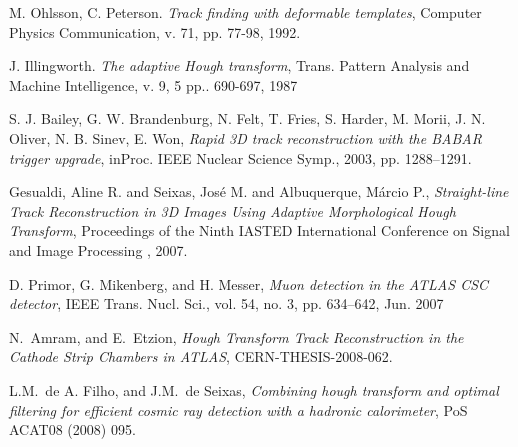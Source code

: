 \documentclass{JINST}
\begin{document}
\begin{thebibliography}{9}
 M. Ohlsson, C. Peterson. 
\emph{Track ﬁnding with deformable templates},
 Computer Physics Communication, v. 71, pp. 77-98, 1992.

 J. Illingworth. 
\emph{The adaptive Hough transform}, 
Trans. Pattern Analysis and Machine Intelligence, v. 9, 5 pp.. 690-697, 1987


 S. J. Bailey, G. W. Brandenburg, N. Felt, T. Fries, S. Harder, M. Morii, J. N. Oliver, N. B. Sinev, E. Won,
\emph{Rapid 3D track reconstruction with the BABAR trigger upgrade},
 inProc. IEEE Nuclear Science Symp., 2003, pp. 1288–1291.

 Gesualdi, Aline R. and Seixas, Jos{\'e} M. and Albuquerque, M\'{a}rcio P.,
\emph{Straight-line Track Reconstruction in 3D Images Using Adaptive Morphological Hough Transform},
 Proceedings of the Ninth IASTED International Conference on Signal and Image Processing , 2007.



 D. Primor, G. Mikenberg, and H. Messer,
\emph{Muon detection in the ATLAS CSC detector},
 IEEE Trans. Nucl. Sci., vol. 54, no. 3, pp. 634–642, Jun. 2007


 N.~Amram, and E.~Etzion,
\emph{Hough Transform Track Reconstruction in the Cathode Strip Chambers in ATLAS},
CERN-THESIS-2008-062.



 L.M.~de A. Filho, and J.M.~de Seixas,
\emph{Combining hough transform and optimal filtering for efficient cosmic ray detection with a hadronic calorimeter},
PoS ACAT08 (2008) 095.





\end{thebibliography}
\end{document}
